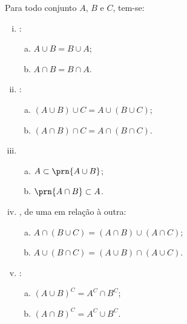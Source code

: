 \begin{proposition}
\label{prop:uniao-e-intersecao}
Para todo conjunto $A$, $B$ e $C$, tem-se:
\begin{enumerate}[i)]
\item {}: 
	\begin{enumerate}[a)]
		\item $A \cup B = B \cup A$;
		\item $A \cap B = B \cap A$.
	\end{enumerate}
\item {}:
	\begin{enumerate}[a)]
		\item $\left(A \cup B \right) \cup C = A \cup \left( B \cup C \right)$;
		\item $\left(A \cap B \right) \cap C = A \cap \left( B \cap C \right)$.
	\end{enumerate}
\item %
	\begin{enumerate}[a)]
		\item $A \subset \prn{A \cup B}$;
		\item $\prn{A \cap B} \subset A$.
	\end{enumerate}
\item {}, de uma em relação à outra:
	\begin{enumerate}[a)]
		\item $A \cap \left( B \cup C \right) = \left(A \cap B \right) \cup \left( A \cap C \right)$;
		\item $A \cup \left( B \cap C \right) = \left(A \cup B \right) \cap \left( A \cup C  \right)$.
	\end{enumerate}
\item
	:
	\begin{enumerate}[a)]
		\item $\left( A \cup B \right)^C = A^C \cap B^C$;
		\item $\left(A \cap B \right)^C = A^C \cup B^C$.
	\end{enumerate}
\end{enumerate}
\end{proposition}

